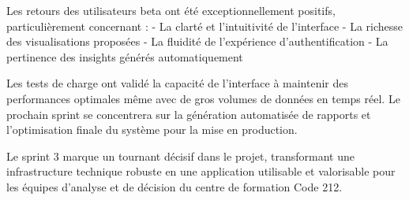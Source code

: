 Les retours des utilisateurs beta ont été exceptionnellement positifs, particulièrement concernant :
- La clarté et l'intuitivité de l'interface
- La richesse des visualisations proposées
- La fluidité de l'expérience d'authentification
- La pertinence des insights générés automatiquement

Les tests de charge ont validé la capacité de l'interface à maintenir des performances optimales même avec de gros volumes de données en temps réel. Le prochain sprint se concentrera sur la génération automatisée de rapports et l'optimisation finale du système pour la mise en production.

Le sprint 3 marque un tournant décisif dans le projet, transformant une infrastructure technique robuste en une application utilisable et valorisable pour les équipes d'analyse et de décision du centre de formation Code 212.